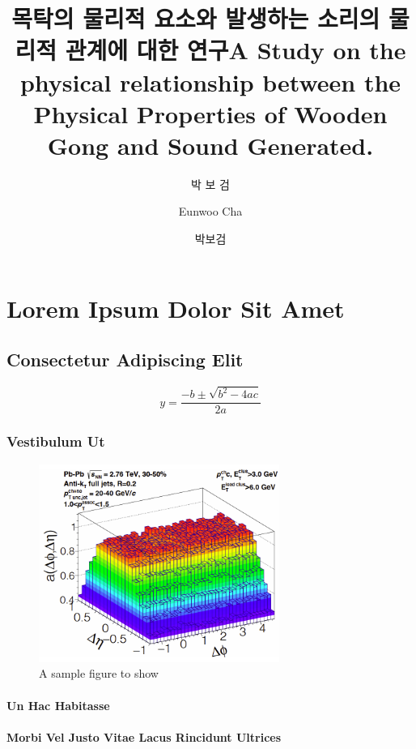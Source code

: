 \documentclass[doctor, english]{pnuthesis}
\title[korean]{목탁의 물리적 요소와 발생하는 소리의 물리적 관계에 대한 연구}
\title[english]{A Study on the physical relationship between the Physical Properties of Wooden Gong and Sound Generated.}
\author[korean]{박 보 검}
\author[english]{Eunwoo Cha}
\author[nospace]{박보검}
\begin{document}
\renewcommand{\baselinestretch}{1.5}    %
\selectfont                             %

\changepage{5mm}{}{}{}{}{}{}{}{-5mm}    %
\makelists   %



\chapter{Lorem Ipsum Dolor Sit Amet}
\lipsum[1]
\section{Consectetur Adipiscing Elit}
\lipsum[2-3]
\begin{equation}
	y = \frac{-b \pm \sqrt{b^2-4ac}}{2a}
\end{equation}
\lipsum[11]
\subsection{Vestibulum Ut}
\lipsum[4]
\begin{figure}
	\centering
	\includegraphics[width=0.7\textwidth]{figure/samplefig1.png}
	\caption{A sample figure to show}
\end{figure}
\lipsum[15]
\subsubsection{Un Hac Habitasse}
\lipsum[5]
\subsubsection{Morbi Vel Justo Vitae Lacus Rincidunt Ultrices}
\lipsum[6]
\end{document}

